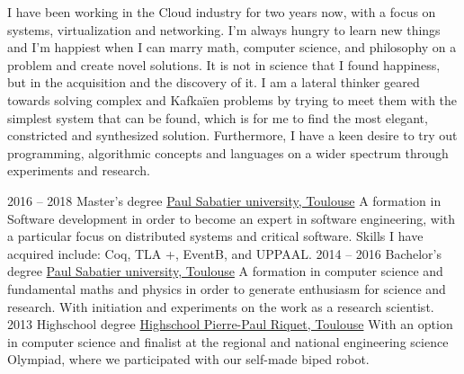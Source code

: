 \documentclass[9pt]{developercv}
\begin{document}
\begin{minipage}[t]{0.4\textwidth}
	\vspace{-\baselineskip}
	I have been working in the Cloud industry for two
	years now, with a focus on systems, virtualization and
	networking. I’m always hungry to learn new things
	and I’m happiest when I can marry math, computer
	science, and philosophy on a problem and create
	novel solutions. It is not in science that I found
	happiness, but in the acquisition and the discovery of
	it. I am a lateral thinker geared towards solving
	complex and Kafkaïen problems by trying to meet
	them with the simplest system that can be found,
	which is for me to find the most elegant, constricted
	and synthesized solution. Furthermore, I have a keen
	desire to try out programming, algorithmic concepts
	and languages on a wider spectrum through
	experiments and research.
\end{minipage}
\hfill
\begin{minipage}[t]{0.5\textwidth}
	\vspace{-\baselineskip}
	\begin{barchart}{5.5}
	\end{barchart}
\end{minipage}

\begin{center}
\end{center}



\begin{entrylist}
	\entry
		{2016 -- 2018}
		{Master's degree}
		{\href{http://www.univ-tlse3.fr/}{Paul Sabatier university, Toulouse}}
		{A formation in Software development in order to become an expert in software engineering, with a
		particular focus on distributed systems and critical software. Skills I have acquired include: Coq, TLA
		+, EventB, and UPPAAL.}
	\entry
		{2014 -- 2016}
		{Bachelor's degree}
		{\href{http://www.univ-tlse3.fr/}{Paul Sabatier university, Toulouse}}
		{A formation in computer science and fundamental maths and physics in order to generate enthusiasm
		for science and research. With initiation and experiments on the work as a research scientist.}
	\entry
		{2013}
		{Highschool degree}
		{\href{https://pierre-paul-riquet.mon-ent-occitanie.fr/lycee-riquet/}{Highschool Pierre-Paul Riquet, Toulouse}}
		{With an option in computer science and finalist at the regional and national engineering science Olympiad,
		where we participated with our self-made biped robot.}
\end{entrylist}
\end{document}
